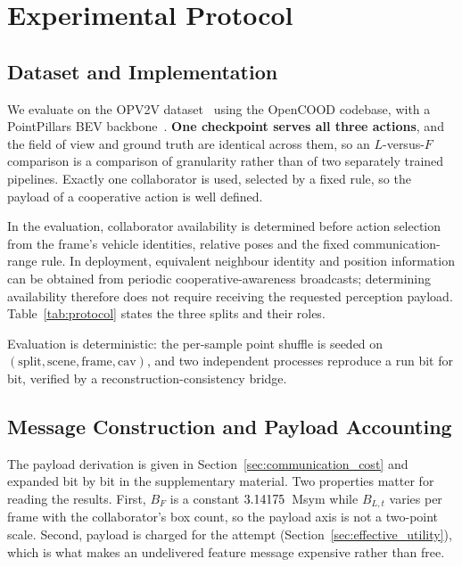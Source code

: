 \documentclass[journal]{IEEEtran}
\begin{document}
\section{Experimental Protocol}\label{sec:exp}

\subsection{Dataset and Implementation}
We evaluate on the OPV2V dataset~\cite{xu2022opv2v} using the OpenCOOD codebase, with a PointPillars
BEV backbone~\cite{lang2019pointpillars}. \textbf{One checkpoint serves all three actions}, and the
field of view and ground truth are identical across them, so an $L$-versus-$F$ comparison is a
comparison of granularity rather than of two separately trained pipelines. Exactly one collaborator
is used, selected by a fixed rule, so the payload of a cooperative action is well defined.

In the evaluation, collaborator availability is determined before action selection from the frame's
vehicle identities, relative poses and the fixed communication-range rule. In deployment,
equivalent neighbour identity and position information can be obtained from periodic
cooperative-awareness broadcasts; determining availability therefore does not require receiving the
requested perception payload.
Table~\ref{tab:protocol} states the three splits and their roles.

Evaluation is deterministic: the per-sample point shuffle is seeded on
$(\text{split}, \text{scene}, \text{frame}, \text{cav})$, and two independent processes reproduce a
run bit for bit, verified by a reconstruction-consistency bridge.

\begin{table}[t]
\caption{Experimental protocol. The development split is where the candidate, the penalty $\lambda$
and the comparator threshold were chosen; both held-out splits were evaluated only after model
and comparator freezing.}
\label{tab:protocol}
\centering\small\setlength{\tabcolsep}{3.5pt}

\end{table}

\subsection{Message Construction and Payload Accounting}
The payload derivation is given in Section~\ref{sec:communication_cost} and expanded bit by bit in
the supplementary material. Two properties
matter for reading the results. First, $B_F$ is a constant $3.14175$~Msym while $B_{L,t}$ varies per
frame with the collaborator's box count, so the payload axis is not a two-point scale. Second,
payload is charged for the attempt (Section~\ref{sec:effective_utility}), which is what makes an
undelivered feature message expensive rather than free.
\end{document}
